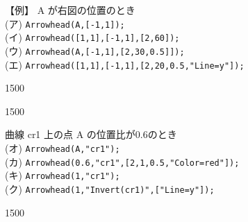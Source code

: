 \documentclass[papersize,a4paper,10pt,uplatex]{jsarticle}
\begin{document}
\begin{description}
【例】 A が右図の位置のとき\\
\hspace*{2.5zw}(ア) \verb|Arrowhead(A,[-1,1]);|\\
\hspace*{2.5zw}(イ) \verb|Arrowhead([1,1],[-1,1],[2,60]);|\\
\hspace*{2.5zw}(ウ) \verb|Arrowhead(A,[-1,1],[2,30,0.5]]);|\\
\hspace*{2.5zw}(エ) \verb|Arrowhead([1,1],[-1,1],[2,20,0.5,"Line=y"]);|

\vspace{5mm}

\begin{layer}{150}{0}
\end{layer}

\vspace{35mm}

\vspace{0.5zw}

\begin{layer}{150}{0}
\end{layer}

曲線 cr1 上の点 A の位置比が0.6のとき\\
\hspace*{2.5zw}(オ) \verb|Arrowhead(A,"cr1");|\\
\hspace*{2.5zw}(カ) \verb|Arrowhead(0.6,"cr1",[2,1,0.5,"Color=red"]);|\\
\hspace*{2.5zw}(キ) \verb|Arrowhead(1,"cr1");|\\
\hspace*{2.5zw}(ク) \verb|Arrowhead(1,"Invert(cr1)",["Line=y"]);|

\vspace{5mm}

\begin{layer}{150}{0}
\end{layer}


\end{description}
\end{document}
